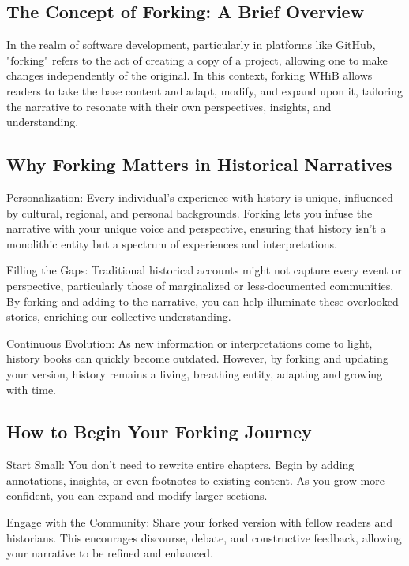 \documentclass[a4paper,12pt]{book}
\begin{document}
\subsection*{The Concept of Forking: A Brief Overview}

In the realm of software development, particularly in platforms like GitHub, "forking" refers to the act of creating a copy of a project, allowing one to make changes independently of the original. In this context, forking WHiB allows readers to take the base content and adapt, modify, and expand upon it, tailoring the narrative to resonate with their own perspectives, insights, and understanding.

\subsection*{Why Forking Matters in Historical Narratives}

Personalization: Every individual's experience with history is unique, influenced by cultural, regional, and personal backgrounds. Forking lets you infuse the narrative with your unique voice and perspective, ensuring that history isn't a monolithic entity but a spectrum of experiences and interpretations.

Filling the Gaps: Traditional historical accounts might not capture every event or perspective, particularly those of marginalized or less-documented communities. By forking and adding to the narrative, you can help illuminate these overlooked stories, enriching our collective understanding.

Continuous Evolution: As new information or interpretations come to light, history books can quickly become outdated. However, by forking and updating your version, history remains a living, breathing entity, adapting and growing with time.

\subsection*{How to Begin Your Forking Journey}

Start Small: You don't need to rewrite entire chapters. Begin by adding annotations, insights, or even footnotes to existing content. As you grow more confident, you can expand and modify larger sections.

Engage with the Community: Share your forked version with fellow readers and historians. This encourages discourse, debate, and constructive feedback, allowing your narrative to be refined and enhanced.
\end{document}
